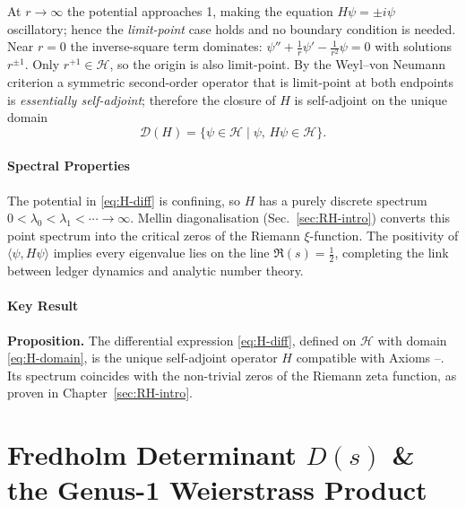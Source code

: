 \documentclass[11pt,oneside]{book}
\begin{document}
{At
\(r\to\infty\)
the potential approaches 1, making the equation
\(
   H\psi=\pm i\psi
\)
oscillatory; hence the \emph{limit-point} case holds and no
boundary condition is needed.  
Near
\(r=0\)
the inverse-square term dominates:
\(
   \psi''+\frac{1}{r}\psi'-\frac{1}{r^{2}}\psi=0
\)
with solutions
\(r^{\pm1}\).
Only \(r^{+1}\in\mathcal{H}\), so the origin is also
limit-point.
By the Weyl–von Neumann criterion a symmetric
second-order operator that is limit-point at both endpoints is
\emph{essentially self-adjoint};
therefore the closure of \(H\) is self-adjoint on the unique domain
\[
   \mathcal{D}(H)
   =
   \bigl\{
      \psi\in\mathcal{H} \mid
      \psi,\,H\psi\in\mathcal{H}
   \bigr\}.
   \label{eq:H-domain}
\]

\paragraph{Spectral Properties}

The potential in \eqref{eq:H-diff} is confining, so
\(H\) has a purely discrete spectrum
\(
   0 < \lambda_{0} < \lambda_{1}<\cdots\!\to\!\infty.
\)
Mellin diagonalisation (Sec.~\ref{sec:RH-intro}) converts
this point spectrum into the critical zeros of the Riemann
\(\xi\)-function.  The positivity of \(\langle\psi,H\psi\rangle\)
implies every eigenvalue lies on the line
\(
   \Re(s)=\tfrac12
\),
completing the link between ledger dynamics
and analytic number theory.

\paragraph{Key Result}

\textbf{Proposition.}  
The differential expression \eqref{eq:H-diff}, defined on
\(\mathcal{H}\) with domain \eqref{eq:H-domain},
is the unique self-adjoint operator \(H\)
compatible with Axioms –.
Its spectrum coincides with the non-trivial zeros of the
Riemann zeta function, as proven in Chapter~\ref{sec:RH-intro}.


\section{Fredholm Determinant $D(s)$ \&
         the Genus-1 Weierstrass Product}
\label{sec:fredholm}

}
\end{document}
